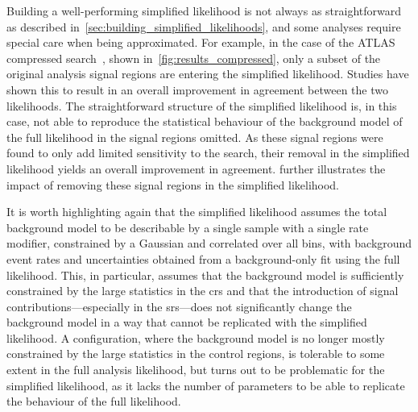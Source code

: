 Building a well-performing simplified likelihood is not always as straightforward as described in~\cref{sec:building_simplified_likelihoods}, and some analyses require special care when being approximated.
For example, in the case of the ATLAS compressed search~\cite{SUSY-2018-16}, shown in~\cref{fig:results_compressed}, only a subset of the original analysis signal regions are entering the simplified likelihood.
Studies have shown this to result in an overall improvement in agreement between the two likelihoods.
The straightforward structure of the simplified likelihood is, in this case, not able to reproduce the statistical behaviour of the background model of the full likelihood in the signal regions omitted.
As these signal regions were found to only add limited sensitivity to the search, their removal in the simplified likelihood yields an overall improvement in agreement.
 further illustrates the impact of removing these signal regions in the simplified likelihood.

It is worth highlighting again that the simplified likelihood assumes the total background model to be describable by a single sample with a single rate modifier, constrained by a Gaussian and correlated over all bins, with background event rates and uncertainties obtained from a background-only fit using the full likelihood.
This, in particular, assumes that the background model is sufficiently constrained by the large statistics in the \glspl{cr} and that the introduction of signal contributions---especially in the \glspl{sr}---does not significantly change the background model in a way that cannot be replicated with the simplified likelihood.
A configuration, where the background model is no longer mostly constrained by the large statistics in the control regions, is tolerable to some extent in the full analysis likelihood, but turns out to be problematic for the simplified likelihood, as it lacks the number of parameters to be able to replicate the behaviour of the full likelihood.  

